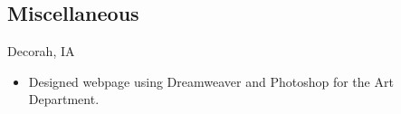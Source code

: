 \documentclass[11pt,letterpaper,sans]{moderncv} %
\begin{document}
  \subsection{Miscellaneous}
     {Decorah, IA}{}
     {\begin{itemize}
         \item Designed webpage using Dreamweaver and Photoshop for the Art Department.
     \end{itemize}}


\end{document}

